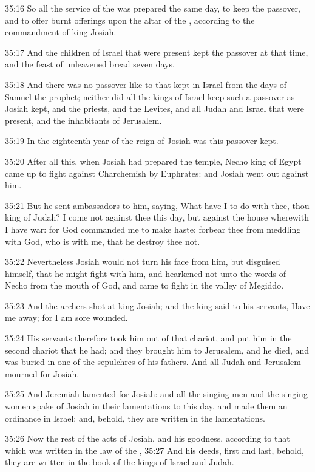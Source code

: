35:16 So all the service of the \LORD was prepared the same day, to
keep the passover, and to offer burnt offerings upon the altar of the
\LORD, according to the commandment of king Josiah.

35:17 And the children of Israel that were present kept the passover
at that time, and the feast of unleavened bread seven days.

35:18 And there was no passover like to that kept in Israel from the
days of Samuel the prophet; neither did all the kings of Israel keep
such a passover as Josiah kept, and the priests, and the Levites, and
all Judah and Israel that were present, and the inhabitants of
Jerusalem.

35:19 In the eighteenth year of the reign of Josiah was this passover
kept.

35:20 After all this, when Josiah had prepared the temple, Necho king
of Egypt came up to fight against Charchemish by Euphrates: and Josiah
went out against him.

35:21 But he sent ambassadors to him, saying, What have I to do with
thee, thou king of Judah? I come not against thee this day, but
against the house wherewith I have war: for God commanded me to make
haste: forbear thee from meddling with God, who is with me, that he
destroy thee not.

35:22 Nevertheless Josiah would not turn his face from him, but
disguised himself, that he might fight with him, and hearkened not
unto the words of Necho from the mouth of God, and came to fight in
the valley of Megiddo.

35:23 And the archers shot at king Josiah; and the king said to his
servants, Have me away; for I am sore wounded.

35:24 His servants therefore took him out of that chariot, and put him
in the second chariot that he had; and they brought him to Jerusalem,
and he died, and was buried in one of the sepulchres of his fathers.
And all Judah and Jerusalem mourned for Josiah.

35:25 And Jeremiah lamented for Josiah: and all the singing men and
the singing women spake of Josiah in their lamentations to this day,
and made them an ordinance in Israel: and, behold, they are written in
the lamentations.

35:26 Now the rest of the acts of Josiah, and his goodness, according
to that which was written in the law of the \LORD, 35:27 And his deeds,
first and last, behold, they are written in the book of the kings of
Israel and Judah.

